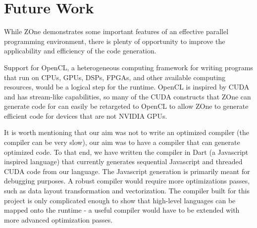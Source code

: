 \section{Future Work}

While ZOne demonstrates some important features of an effective parallel
programming environment, there is plenty of opportunity to improve the
applicability and efficiency of the code generation.

Support for OpenCL, a heterogeneous computing framework for writing programs
that run
on CPUs, GPUs, DSPs, FPGAs, and other available computing resources, would be a
logical step for the runtime. OpenCL is inspired by CUDA and has stream-like
capabilities, so many of the CUDA constructs that ZOne can
generate code for can easily be retargeted to OpenCL to allow ZOne to generate
efficient code for devices that are not NVIDIA GPUs. 

It is worth mentioning that our aim was not to write an optimized
compiler (the compiler can be very slow), our aim was to have a compiler
that can generate optimized code. To that end, we have written the
compiler in Dart (a Javascript inspired language) that currently
generates sequential Javascript and threaded CUDA code from our language.
The Javascript generation is primarily meant for debugging purposes.
A robust compiler would require more optimizations passes, such as data layout
transformation and vectorization. The compiler built for this project is only
complicated enough to show that high-level languages can be mapped onto the
runtime - a useful compiler would have to be extended with more advanced
optimization passes.
